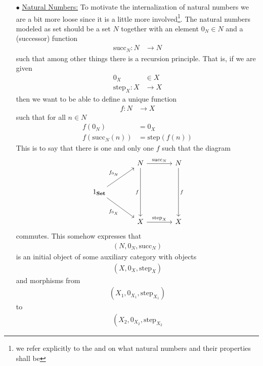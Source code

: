 \begin{exa}
\begin{enumerate}
\item[$\bullet$]
\underline{Natural Numbers:}
To motivate the internalization of natural numbers we are a bit more loose since it is a little more involved\footnote{we refer explicitly to the \cite{wiki-nlab0000} and \cite{1ba1603e} on what natural numbers and their properties shall be}. The natural numbers modeled as set should be a set $N$ together with an element $0_{N} \in N$ and a (successor) function
\begin{align*}
  \mathrm{succ}_{N}
  \colon
  N
  &\rightarrow
  N
\end{align*}
such that among other things there is a recursion principle. That is, if we are given
\begin{align*}
  0_{X}
  &\in
  X
  \\
  \mathrm{step}_{X}
  \colon
  X
  &\rightarrow
  X
\end{align*}
then we want to be able to define a unique function
\begin{align*}
  f
  \colon
  N
  &\rightarrow
  X
\end{align*}
such that for all $n \in N$
\begin{align*}
  f(0_{N})
  &=
  0_{X}
  \\
  f(\mathrm{succ}_{N}(n))
  &=
  \mathrm{step}(f(n))
\end{align*}
This is to say that there is one and only one $f$ such that the diagram
\[
\begin{tikzcd}[sep=large]
  &
  N
  \arrow{r}{\mathrm{succ}_{N}}
  \arrow[swap]{dd}{f}
  &
  N
  \arrow{dd}{f}
  \\
  1_{\mathbf{Set}}
  \arrow{ur}{f_{0_{N}}}
  \arrow[swap]{dr}{f_{0_{X}}}
  &
  &
  \\
  &
  X
  \arrow{r}{\mathrm{step}_{X}}
  &
  X
\end{tikzcd}
\]
commutes. This somehow expresses that
\begin{align*}
  \left(
    N,
    0_{N},
    \mathrm{succ}_{N}
  \right)
\end{align*}
is an initial object of some auxiliary category with objects
\begin{align*}
  \left(
    X,
    0_{X},
    \mathrm{step}_{X}
  \right)
\end{align*}
and morphisms from
\begin{align*}
  \left(
    X_{1},
    0_{X_{1}},
    \mathrm{step}_{X_{1}}
  \right)
\end{align*}
to
\begin{align*}
  \left(
    X_{2},
    0_{X_{2}},
    \mathrm{step}_{X_{2}}

\end{align*}
\end{enumerate}
\end{exa}
